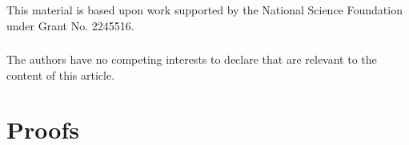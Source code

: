 \documentclass[runningheads]{llncs}
\begin{document}


\begin{credits}
\subsubsection{\ackname}
% 
This material is based upon work supported by the National Science Foundation
under Grant No. 2245516.

\subsubsection{\discintname}
%
The authors have no competing interests to declare that are
relevant to the content of this article.
\end{credits}
%
%
%

% 


\newpage
\appendix

% 

\section{Proofs}

\end{document}
